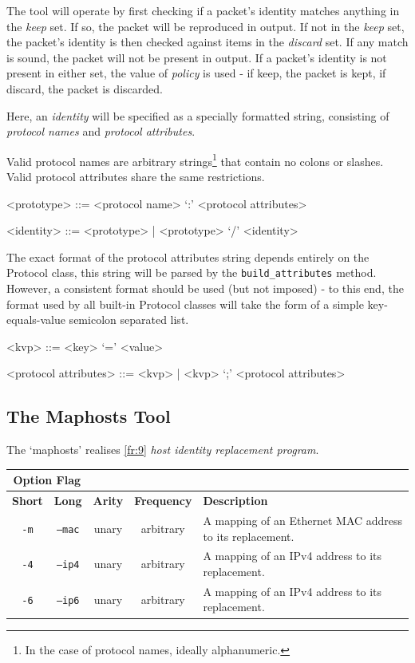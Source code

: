 \documentclass[10pt,a4paper,notitlepage,twoside]{report}
\begin{document}
The tool will operate by first checking if a packet's identity matches anything in the \emph{keep} set. If so, the packet will be reproduced in output. If not in the \emph{keep} set, the packet's identity is then checked against items in the \emph{discard} set. If any match is sound, the packet will not be present in output. If a packet's identity is not present in either set, the value of \emph{policy} is used - if keep, the packet is kept, if discard, the packet is discarded.

Here, an \emph{identity} will be specified as a specially formatted string, consisting of \emph{protocol names} and \emph{protocol attributes}.

Valid protocol names are arbitrary strings\footnote{In the case of protocol names, ideally alphanumeric.} that contain no colons or slashes. Valid protocol attributes share the same restrictions.

\begin{grammar}
<prototype> ::= <protocol name> `:' <protocol attributes>

<identity> ::= <prototype> | <prototype> `/' <identity>
\end{grammar}

The exact format of the protocol attributes string depends entirely on the Protocol class, this string will be parsed by the \texttt{build_attributes} method. However, a consistent format should be used (but not imposed) - to this end, the format used by all built-in Protocol classes will take the form of a simple key-equals-value semicolon separated list.

\begin{grammar}
<kvp> ::= <key> `=' <value>

<protocol attributes> ::= <kvp> | <kvp> `;' <protocol attributes>
\end{grammar}


\subsection{The Maphosts Tool}
The `maphosts' realises \ref{fr:9} \emph{host identity replacement program}.

\begin{tabularx}{\textwidth}{|c|c|c|c|X|}
\cline{1-2}
\multicolumn{2}{|c|}{\textbf{Option Flag}} & \multicolumn{3}{c}{}\\ \hline
\textbf{Short} & \textbf{Long} & \textbf{Arity} & \textbf{Frequency} & \textbf{Description} \\ \hline
\texttt{-m} & \texttt{--mac} & unary & arbitrary & A mapping of an Ethernet MAC address to its replacement.\\ \hline
\texttt{-4} & \texttt{--ip4} & unary & arbitrary & A mapping of an IPv4 address to its replacement.\\ \hline
\texttt{-6} & \texttt{--ip6} & unary & arbitrary & A mapping of an IPv4 address to its replacement.\\ \hline
\end{tabularx}
\end{document}
